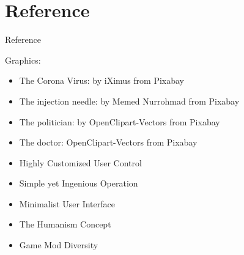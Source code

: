 \documentclass{beamer}
\begin{document}
\section{Reference}

\begin{frame}{Reference}

	Graphics:
	\begin{itemize}\bigsep
		\item The Corona Virus: by iXimus from Pixabay
		\item The injection needle: by Memed Nurrohmad from Pixabay
		\item The politician: by OpenClipart-Vectors from Pixabay
		\item The doctor: OpenClipart-Vectors from Pixabay
	\end{itemize}

\end{frame}




\begin{framek}

\begin{itemize}\itemsep .5cm
		\item Highly Customized User Control
		\item Simple yet Ingenious Operation
		\item Minimalist User Interface
		\item The Humanism Concept
		\item Game Mod Diversity
	\end{itemize}

\end{framek}
\end{document}
